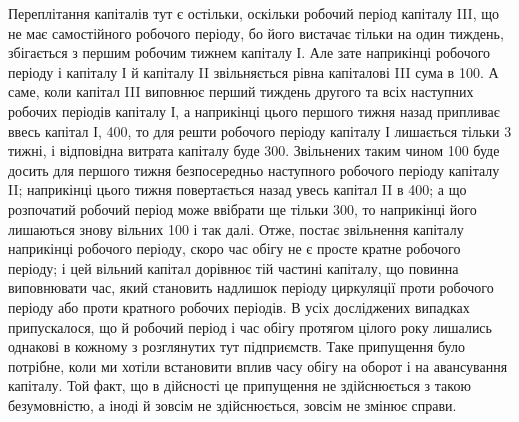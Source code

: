 Переплітання капіталів тут є остільки, оскільки робочий період капіталу
III, що не має самостійного робочого періоду, бо його вистачає
тільки на один тиждень, збігається з першим робочим тижнем капіталу І.
Але зате наприкінці робочого періоду і капіталу І й капіталу II
звільняється рівна капіталові III сума в 100. А саме, коли капітал
III виповнює перший тиждень другого та всіх наступних робочих періодів
капіталу І, а наприкінці цього першого тижня назад припливає ввесь
капітал І, 400, то для решти робочого періоду капіталу І лишається
тільки 3 тижні, і відповідна витрата капіталу буде 300. Звільнених
таким чином 100 буде досить для першого тижня безпосередньо
наступного робочого періоду капіталу II; наприкінці цього тижня повертається
назад увесь капітал II в 400; а що розпочатий робочий
період може ввібрати ще тільки 300, то наприкінці його лишаються
знову вільних 100 і так далі. Отже, постає звільнення капіталу
наприкінці робочого періоду, скоро час обігу не є просте кратне
робочого періоду; і цей вільний капітал дорівнює тій частині капіталу,
що повинна виповнювати час, який становить надлишок періоду циркуляції
проти робочого періоду або проти кратного робочих періодів.
В усіх досліджених випадках припускалося, що й робочий період і
час обігу протягом цілого року лишались однакові в кожному з розглянутих
тут підприємств. Таке припущення було потрібне, коли ми хотіли
встановити вплив часу обігу на оборот і на авансування капіталу. Той
факт, що в дійсності це припущення не здійснюється з такою безумовністю,
а іноді й зовсім не здійснюється, зовсім не змінює справи.

